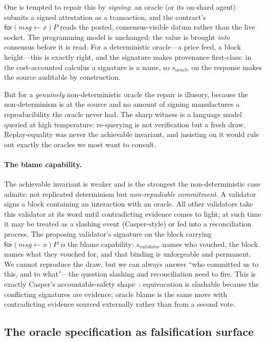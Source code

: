 \documentclass[11pt]{article}
\begin{document}
One is tempted to repair this by \emph{signing}: an oracle (or its on-shard agent) submits a
signed attestation as a transaction, and the contract's
$\mathsf{for}(\mathit{msg}\leftarrow x)P$ reads the posted, consensus-visible datum rather
than the live socket. The programming model is unchanged; the value is brought \emph{into}
consensus before it is read. For a deterministic oracle---a price feed, a block height---this
is exactly right, and the signature makes provenance first-class: in the cost-accounted
calculus a signature is a name, so $s_{\mathit{oracle}}$ on the response makes the source
auditable by construction.

But for a \emph{genuinely} non-deterministic oracle the repair is illusory, because the
non-determinism is at the source and no amount of signing manufactures a reproducibility the
oracle never had. The sharp witness is a language model queried at high temperature:
re-querying is not verification but a fresh draw. Replay-equality was never the achievable
invariant, and insisting on it would rule out exactly the oracles we most want to consult.

\paragraph{The blame capability.} The achievable invariant is weaker and is the strongest the
non-deterministic case admits: not replicated determinism but \emph{non-repudiable
commitment}. A validator signs a block containing an interaction with an oracle. All other
validators take this validator at its word until contradicting evidence comes to light; at
such time it may be treated as a slashing event (Casper-style) or fed into a reconciliation
process. The proposing validator's signature on the block carrying
$\mathsf{for}(\mathit{msg}\leftarrow x)P$ \emph{is} the blame capability:
$s_{\mathit{validator}}$ names who vouched, the block names what they vouched for, and that
binding is unforgeable and permanent. We cannot reproduce the draw, but we can always answer
``who committed us to this, and to what''---the question slashing and reconciliation need to
fire. This is exactly Casper's accountable-safety shape~\cite{casper}: equivocation is
slashable because the conflicting signatures are evidence; oracle blame is the same move with
contradicting evidence sourced externally rather than from a second vote.

\subsection{The oracle specification as falsification surface}\label{sec:oracle-spec}
\end{document}
